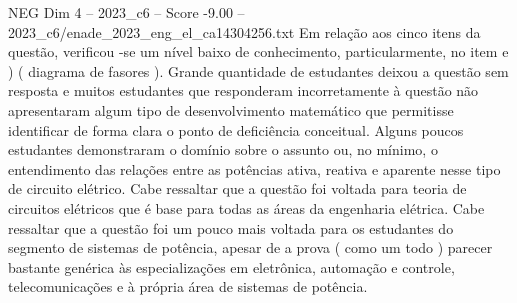 \begin{textsample}{NEG Dim 4 – 2023\_c6 – Score -9.00 – 2023\_c6/enade\_2023\_eng\_el\_ca14304256.txt}
Em relação aos cinco itens da questão, verificou -se um nível baixo de conhecimento, particularmente, no item e ) ( diagrama de fasores ).
Grande quantidade de estudantes deixou a questão sem resposta e muitos estudantes que responderam incorretamente à questão não apresentaram algum tipo de desenvolvimento matemático que permitisse identificar de forma clara o ponto de deficiência conceitual.
Alguns poucos estudantes demonstraram o domínio sobre o assunto ou, no mínimo, o entendimento das relações entre as potências ativa, reativa e aparente nesse tipo de circuito elétrico.
Cabe ressaltar que a questão foi voltada para teoria de circuitos elétricos que é base para todas as áreas da engenharia elétrica.
Cabe ressaltar que a questão foi um pouco mais voltada para os estudantes do segmento de sistemas de potência, apesar de a prova ( como um todo ) parecer bastante genérica às especializações em eletrônica, automação e controle, telecomunicações e à própria área de sistemas de potência.

\end{textsample}
